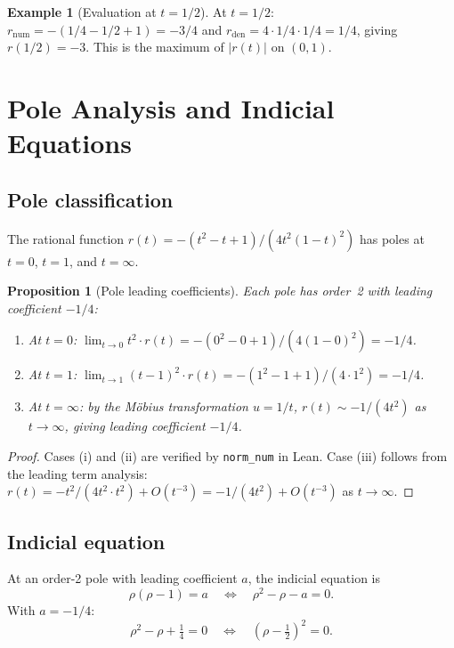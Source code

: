 \documentclass[11pt]{article}
\theoremstyle{plain}
\newtheorem{proposition}[theorem]{Proposition}
\theoremstyle{definition}
\newtheorem{example}[theorem]{Example}
\theoremstyle{remark}
\begin{document}
\begin{example}[Evaluation at $t = 1/2$]\label{ex:eval}
At $t = 1/2$: $r_{\mathrm{num}} = -(1/4 - 1/2 + 1) = -3/4$ and $r_{\mathrm{den}} = 4 \cdot 1/4 \cdot 1/4 = 1/4$, giving $r(1/2) = -3$.
This is the maximum of $|r(t)|$ on $(0,1)$.
\end{example}

\section{Pole Analysis and Indicial Equations}
\label{sec:poles}

\subsection{Pole classification}

The rational function $r(t) = -(t^2 - t + 1)/(4t^2(1-t)^2)$ has poles at $t = 0$, $t = 1$, and $t = \infty$.

\begin{proposition}[Pole leading coefficients]\label{prop:poles}
Each pole has order~2 with leading coefficient $-1/4$:
\begin{enumerate}[label=(\roman*)]
  \item At $t = 0$: $\lim_{t \to 0} t^2 \cdot r(t) = -(0^2 - 0 + 1)/(4(1-0)^2) = -1/4$.
  \item At $t = 1$: $\lim_{t \to 1} (t-1)^2 \cdot r(t) = -(1^2 - 1 + 1)/(4 \cdot 1^2) = -1/4$.
  \item At $t = \infty$: by the M\"obius transformation $u = 1/t$, $r(t) \sim -1/(4t^2)$ as $t \to \infty$, giving leading coefficient $-1/4$.
\end{enumerate}
\end{proposition}

\begin{proof}
Cases (i) and (ii) are verified by \texttt{norm\_num} in Lean.  Case (iii) follows from the leading term analysis: $r(t) = -t^2/(4t^2 \cdot t^2) + O(t^{-3}) = -1/(4t^2) + O(t^{-3})$ as $t \to \infty$.
\end{proof}

\subsection{Indicial equation}

At an order-2 pole with leading coefficient $a$, the indicial equation is
\begin{equation}\label{eq:indicial}
  \rho(\rho - 1) = a \quad\Longleftrightarrow\quad \rho^2 - \rho - a = 0.
\end{equation}
With $a = -1/4$:
\[
  \rho^2 - \rho + \tfrac{1}{4} = 0 \quad\Longleftrightarrow\quad (\rho - \tfrac{1}{2})^2 = 0.
\]
\end{document}
